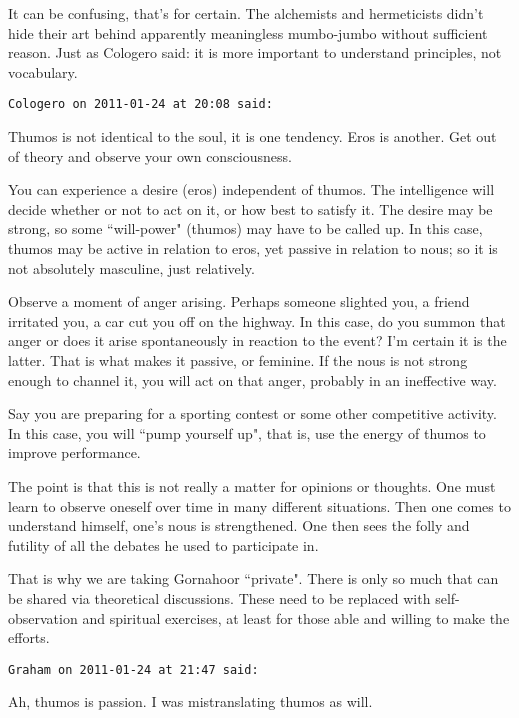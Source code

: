 \begin{footnotesize}
\begin{sffamily}
It can be confusing, that's for certain. The alchemists and hermeticists didn't hide their art behind apparently meaningless mumbo-jumbo without sufficient reason. Just as Cologero said: it is more important to understand principles, not vocabulary.


\hfill

\texttt{Cologero on 2011-01-24 at 20:08 said: }

Thumos is not identical to the soul, it is one tendency. Eros is another. Get out of theory and observe your own consciousness.

You can experience a desire (eros) independent of thumos. The intelligence will decide whether or not to act on it, or how best to satisfy it. The desire may be strong, so some ``will-power" (thumos) may have to be called up. In this case, thumos may be active in relation to eros, yet passive in relation to nous; so it is not absolutely masculine, just relatively.

Observe a moment of anger arising. Perhaps someone slighted you, a friend irritated you, a car cut you off on the highway. In this case, do you summon that anger or does it arise spontaneously in reaction to the event? I'm certain it is the latter. That is what makes it passive, or feminine. If the nous is not strong enough to channel it, you will act on that anger, probably in an ineffective way.

Say you are preparing for a sporting contest or some other competitive activity. In this case, you will ``pump yourself up", that is, use the energy of thumos to improve performance.

The point is that this is not really a matter for opinions or thoughts. One must learn to observe oneself over time in many different situations. Then one comes to understand himself, one's nous is strengthened. One then sees the folly and futility of all the debates he used to participate in.

That is why we are taking Gornahoor ``private". There is only so much that can be shared via theoretical discussions. These need to be replaced with self-observation and spiritual exercises, at least for those able and willing to make the efforts.


\hfill

\texttt{Graham on 2011-01-24 at 21:47 said: }

Ah, thumos is passion. I was mistranslating thumos as will.
\end{sffamily}\end{footnotesize}
